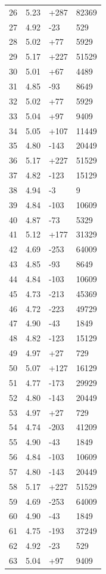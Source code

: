 \documentclass[12pt]{article}
\begin{document}
\begin{xltabular}{\textwidth}{@{}X X X X@{}}
		26 & 5.23 & +287 & 82369 \\
		27 & 4.92 & -23 & 529 \\
		28 & 5.02 & +77 & 5929 \\
		29 & 5.17 & +227 & 51529 \\
		30 & 5.01 & +67 & 4489 \\
		31 & 4.85 & -93 & 8649 \\
		32 & 5.02 & +77 & 5929 \\
		33 & 5.04 & +97 & 9409 \\
		34 & 5.05 & +107 & 11449 \\
		35 & 4.80 & -143 & 20449 \\
		36 & 5.17 & +227 & 51529 \\
		37 & 4.82 & -123 & 15129 \\
		38 & 4.94 & -3 & 9 \\
		39 & 4.84 & -103 & 10609 \\
		40 & 4.87 & -73 & 5329 \\
		41 & 5.12 & +177 & 31329 \\
		42 & 4.69 & -253 & 64009 \\
		43 & 4.85 & -93 & 8649 \\
		44 & 4.84 & -103 & 10609 \\
		45 & 4.73 & -213 & 45369 \\
		46 & 4.72 & -223 & 49729 \\
		47 & 4.90 & -43 & 1849 \\
		48 & 4.82 & -123 & 15129 \\
		49 & 4.97 & +27 & 729 \\
		50 & 5.07 & +127 & 16129 \\
		51 & 4.77 & -173 & 29929 \\
		52 & 4.80 & -143 & 20449 \\
		53 & 4.97 & +27 & 729 \\
		54 & 4.74 & -203 & 41209 \\
		55 & 4.90 & -43 & 1849 \\
		56 & 4.84 & -103 & 10609 \\
		57 & 4.80 & -143 & 20449 \\
		58 & 5.17 & +227 & 51529 \\
		59 & 4.69 & -253 & 64009 \\
		60 & 4.90 & -43 & 1849 \\
		61 & 4.75 & -193 & 37249 \\
		62 & 4.92 & -23 & 529 \\
		63 & 5.04 & +97 & 9409 \\

\end{xltabular}
\end{document}
